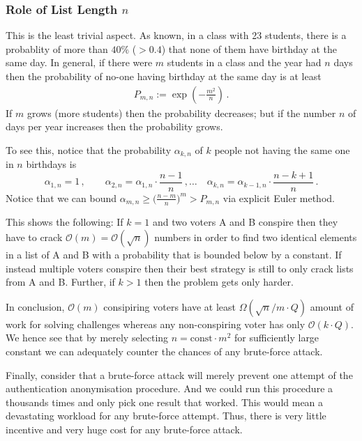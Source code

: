 \documentclass{article}
\newcommand{\cO}{\mathcal{O}\xspace}
\theoremstyle{definition}
\begin{document}
	\subsubsection{Role of List Length $n$}
	This is the least trivial aspect. As known, in a class with 23 students, there is a probablity of more than $40\%$ ($>0.4$) that none of them have birthday at the same day. In general, if there were $m$ students in a class and the year had $n$ days then the probability of no-one having birthday at the same day is at least
	\begin{align*}
		P_{m,n} := \exp\left(-\frac{m^2}{n}\right)\,.
	\end{align*}
	If $m$ grows (more students) then the probability decreases; but if the number $n$ of days per year increases then the probability grows.
	
	To see this, notice that the probability $\alpha_{k,n}$ of $k$ people not having the same one in $n$ birthdays is
	$$ \alpha_{1,n}=1\,,\qquad \alpha_{2,n}=\alpha_{1,n} \cdot \frac{n-1}{n}\,,\dots\quad \alpha_{k,n} =\alpha_{k-1,n} \cdot \frac{n-k+1}{n}\,. $$
	Notice that we can bound $\alpha_{m,n} \geq \big(\frac{n-m}{n}\big)^m > P_{m,n}$ via explicit Euler method.
	
	\vspace{3mm}
	
	This shows the following: If $k=1$ and two voters A and B conspire then they have to crack $\cO(m)=\cO(\sqrt{n})$ numbers in order to find two identical elements in a list of A and B with a probability that is bounded below by a constant. If instead multiple voters conspire then their best strategy is still to only crack lists from A and B. Further, if $k>1$ then the problem gets only harder.
	
	In conclusion, $\cO(m)$ consipiring voters have at least $\Omega(\sqrt{n}/m \cdot Q)$ amount of work for solving challenges whereas any non-conspiring voter has only $\cO(k \cdot Q)$. We hence see that by merely selecting $n = \text{const} \cdot m^2$ for sufficiently large constant we can adequately counter the chances of any brute-force attack.
	
	Finally, consider that a brute-force attack will merely prevent one attempt of the authentication anonymisation procedure. And we could run this procedure a thousands times and only pick one result that worked. This would mean a devastating workload for any brute-force attempt. Thus, there is very little incentive and very huge cost for any brute-force attack.
	
\end{document}
